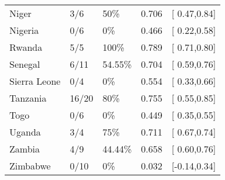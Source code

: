 \begin{table}[ht]
\begin{tabular}{lllrl}
  Niger & 3/6 & 50\% & 0.706 & [ 0.47,0.84] \\ 
  Nigeria & 0/6 & 0\% & 0.466 & [ 0.22,0.58] \\ 
  Rwanda & 5/5 & 100\% & 0.789 & [ 0.71,0.80] \\ 
  Senegal & 6/11 & 54.55\% & 0.704 & [ 0.59,0.76] \\ 
  Sierra Leone & 0/4 & 0\% & 0.554 & [ 0.33,0.66] \\ 
  Tanzania & 16/20 & 80\% & 0.755 & [ 0.55,0.85] \\ 
  Togo & 0/6 & 0\% & 0.449 & [ 0.35,0.55] \\ 
  Uganda & 3/4 & 75\% & 0.711 & [ 0.67,0.74] \\ 
  Zambia & 4/9 & 44.44\% & 0.658 & [ 0.60,0.76] \\ 
  Zimbabwe & 0/10 & 0\% & 0.032 & [-0.14,0.34] \\ 
   \hline
\end{tabular}
\end{table}
